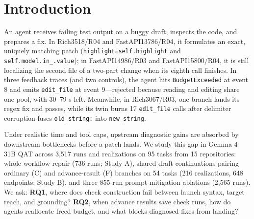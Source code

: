 \section{Introduction}
An agent receives failing test output on a buggy draft, inspects the code, and prepares a fix. In Rich3518/R04 and FastAPI13786/R04, it formulates an exact, uniquely matching patch (\texttt{highlight=self.highlight} and \texttt{self.model.in\_.value}); in FastAPI14986/R03 and FastAPI15800/R04, it is still localizing the second file of a two-part change when its eighth call finishes. In three feedback traces (and two controls), the agent hits \texttt{BudgetExceeded} at event 8 and emits \texttt{edit\_file} at event 9---rejected because reading and editing share one pool, with 30--79 s left. Meanwhile, in Rich3067/R03, one branch lands its regex fix and passes, while its twin burns 17 \texttt{edit\_file} calls after delimiter corruption fuses \texttt{old\_string:} into \texttt{new\_string}.

Under realistic time and tool caps, upstream diagnostic gains are absorbed by downstream bottlenecks before a patch lands. We study this gap in Gemma 4 31B QAT across 3,517 runs and realizations on 95 tasks from 15 repositories: whole-workflow repair (736 runs; Study A), shared-draft continuations pairing ordinary (C) and advance-result (F) branches on 54 tasks (216 realizations, 648 endpoints; Study B), and three 855-run prompt-mitigation ablations (2,565 runs). We ask: \textbf{RQ1}, where does check construction fail between launch syntax, target reach, and grounding? \textbf{RQ2}, when advance results save check runs, how do agents reallocate freed budget, and what blocks diagnosed fixes from landing?
